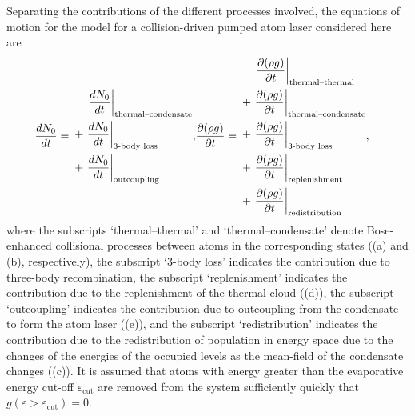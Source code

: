 Separating the contributions of the different processes involved, the equations of motion for the model for a collision-driven pumped atom laser considered here are
\begin{align}
    \frac{d N_0}{d t} =\begin{split}
        &\relphantom{+}\left. \frac{d N_0}{d t}\right|_\text{thermal--condensate} \\
        &+\left. \frac{d N_0}{d t}\right|_\text{3-body loss} \\
        &+\left. \frac{d N_0}{d t}\right|_\text{outcoupling}
    \end{split},
    & \frac{\partial (\rho g)}{\partial t} = \begin{split}
        &\relphantom{+}\left. \frac{\partial (\rho g)}{\partial t}\right|_\text{thermal--thermal} \\
        &+\left. \frac{\partial (\rho g)}{\partial t}\right|_\text{thermal--condensate} \\
        &+\left. \frac{\partial (\rho g)}{\partial t}\right|_\text{3-body loss} \\
        &+\left. \frac{\partial (\rho g)}{\partial t}\right|_\text{replenishment} \\
        &+\left. \frac{\partial (\rho g)}{\partial t}\right|_\text{redistribution}
    \end{split},
    \label{KineticTheory:EvolutionEquations}
\end{align}
where the subscripts `thermal--thermal' and `thermal--condensate' denote Bose-enhanced collisional processes between atoms in the corresponding states ((a) and (b), respectively), the subscript `3-body loss' indicates the contribution due to three-body recombination, the subscript `replenishment' indicates the contribution due to the replenishment of the thermal cloud ((d)), the subscript `outcoupling' indicates the contribution due to outcoupling from the condensate to form the atom laser ((e)), and the subscript `redistribution' indicates the contribution due to the redistribution of population in energy space due to the changes of the energies of the occupied levels as the mean-field of the condensate changes ((c)). It is assumed that atoms with energy greater than the evaporative energy cut-off $\varepsilon_\text{cut}$ are removed from the system sufficiently quickly that  $g(\varepsilon > \varepsilon_\text{cut}) = 0$.


